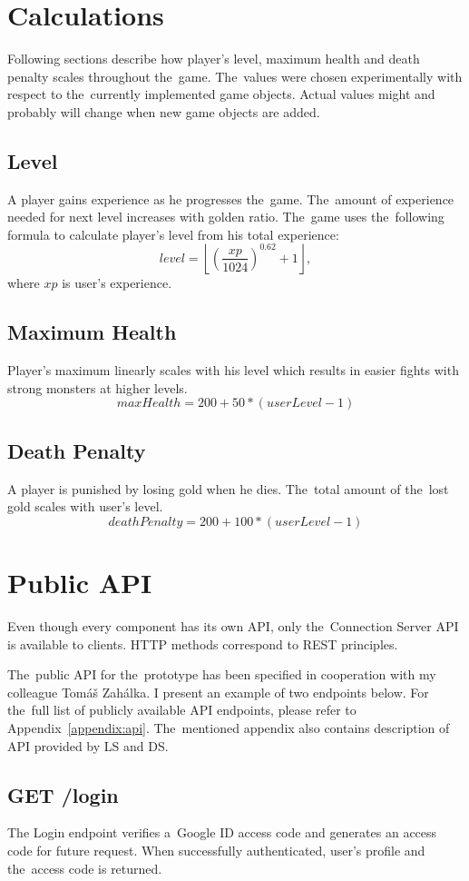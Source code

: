 \section{Calculations}
Following sections describe how player's level, maximum health and death penalty scales throughout the~game. The~values were chosen experimentally with respect to the~currently implemented game objects. Actual values might and probably will change when new game objects are added.

	\subsection{Level}
	\label{section:level}
	A player gains experience as he progresses the~game. The~amount of experience needed for next level increases with golden ratio. The~game uses the~following formula to calculate player's level from his total experience: 
	\[ level = \left\lfloor{\left(\frac{xp}{1024}\right)^{0.62} + 1}\right\rfloor, \]
	where $xp$ is user's experience.
	\subsection{Maximum Health}
	Player's maximum linearly scales with his level which results in easier fights with strong monsters at higher levels.
	\[ maxHealth = 200 + 50 * (userLevel - 1) \]
	
	\subsection{Death Penalty}
	A player is punished by losing gold when he dies. The~total amount of the~lost gold scales with user's level.
	\[ deathPenalty = 200 + 100 * (userLevel - 1) \]

\section{Public API}
Even though every component has its own API, only the~Connection Server API is available to clients. HTTP methods correspond to REST principles.

The~public API for the~prototype has been specified in cooperation with my colleague Tomáš Zahálka. I present an example of two endpoints below. For the~full list of publicly available API endpoints, please refer to Appendix~\ref{appendix:api}. The~mentioned appendix also contains description of API provided by LS and DS. 	

	\subsection{GET /login}
		The Login endpoint verifies a~Google ID access code and generates an access code for future request. When successfully authenticated, user's profile and the~access code is returned.
